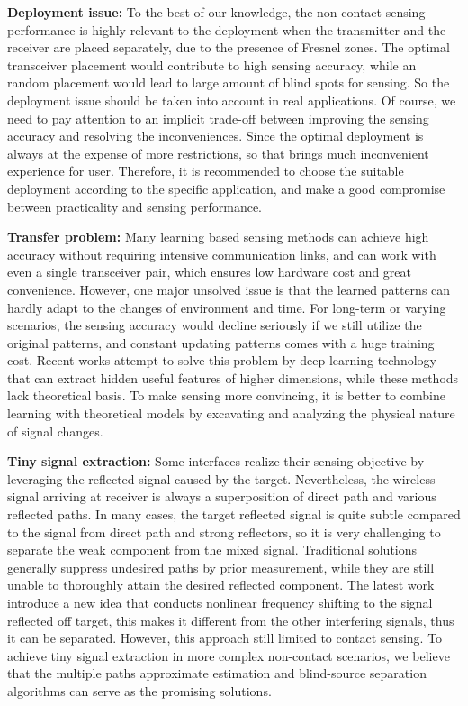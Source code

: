 \textbf{Deployment issue:} To the best of our knowledge, the non-contact sensing performance is highly relevant to the deployment when the transmitter and the receiver are placed separately, due to the presence of Fresnel zones. The optimal transceiver placement would contribute to high sensing accuracy, while an random placement would lead to large amount of blind spots for sensing. So the deployment issue should be taken into account in real applications. Of course, we need to pay attention to an implicit trade-off between improving the sensing accuracy and resolving the inconveniences. Since the optimal deployment is always at the expense of more restrictions, so that brings much inconvenient experience for user. Therefore, it is recommended to choose the suitable deployment according to the specific application, and make a good compromise between practicality and sensing performance.

\textbf{Transfer problem:} Many learning based sensing methods can achieve high accuracy without requiring intensive communication links, and can work with even a single transceiver pair, which ensures low hardware cost and great convenience. However, one major unsolved issue is that the learned patterns can hardly adapt to the changes of environment and time. For long-term or varying scenarios, the sensing accuracy would decline seriously if we still utilize the original patterns, and constant updating patterns comes with a huge training cost. Recent works attempt to solve this problem by deep learning technology that can extract hidden useful features of higher dimensions, while these methods lack theoretical basis. To make sensing more convincing, it is better to combine learning with theoretical models by excavating and analyzing the physical nature of signal changes.

\textbf{Tiny signal extraction:} Some interfaces realize their sensing objective by leveraging the reflected signal caused by the target. Nevertheless, the wireless signal arriving at receiver is always a superposition of  direct path and various reflected paths. In many cases, the target reflected signal is quite subtle compared to the signal from direct path and strong reflectors, so it is very challenging to separate the weak component from the mixed signal. Traditional solutions generally suppress undesired paths by prior measurement, while they are still unable to thoroughly attain the desired reflected component. The latest work introduce a new idea that conducts nonlinear frequency shifting to the signal reflected off target, this makes it different from the other interfering signals, thus it can be separated. However, this approach still limited to contact sensing. To achieve tiny signal extraction in more complex non-contact scenarios, we believe that the multiple paths approximate estimation and blind-source separation algorithms can serve as the promising solutions.


